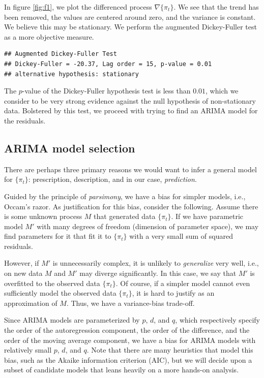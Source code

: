 \documentclass[final,
  11pt,
]{article}
\begin{document}
In figure \ref{fig:f1}, we plot the differenced process \(\nabla\{\pi_t\}\).
We see that the trend has been removed, the values are centered around
zero, and the variance is constant. We believe this may be stationary.
We perform the augmented Dickey-Fuller
test\cite{noauthor_dickeyfuller_2021} as a more objective measure.

\begin{verbatim}
## Augmented Dickey-Fuller Test
## Dickey-Fuller = -20.37, Lag order = 15, p-value = 0.01
## alternative hypothesis: stationary
\end{verbatim}

The \(p\)-value of the Dickey-Fuller hypothesis test is less than
\(0.01\), which we consider to be very strong evidence against the null
hypothesis of non-stationary data. Bolstered by this test, we proceed
with trying to find an ARIMA model for the residuals.

\hypertarget{arima-model-selection}{%
\subsection{ARIMA model selection}\label{arima-model-selection}}

There are perhaps three primary reasons we would want to infer a general
model for \(\{\pi_t\}\): prescription, description, and in our case,
\emph{prediction}.

Guided by the principle of \emph{parsimony}, we have a bias for simpler
models, i.e., Occam's razor. As justification for this bias, consider
the following. Assume there is some unknown process \(M\) that generated
data \(\{\pi_t\}\). If we have parametric model \(M'\) with many degrees
of freedom (dimension of parameter space), we may find parameters for it
that fit it to \(\{\pi_t\}\) with a very small sum of squared residuals.

However, if \(M'\) is unnecessarily complex, it is unlikely to
\emph{generalize} very well, i.e., on new data \(M\) and \(M'\) may
diverge significantly. In this case, we say that \(M'\) is overfitted to
the observed data \(\{\pi_t\}\). Of course, if a simpler model cannot
even sufficiently model the observed data \(\{\pi_t\}\), it is hard to
justify as an approximation of \(M\). Thus, we have a variance-bias
trade-off\cite{bias_variance}.

Since ARIMA models are parameterized by \(p\), \(d\), and \(q\), which
respectively specify the order of the autoregression component, the
order of the difference, and the order of the moving average component,
we have a bias for ARIMA models with relatively small \(p\), \(d\), and
\(q\). Note that there are many heuristics that model this bias, such as
the Akaike information criterion (AIC), but we will decide upon a subset
of candidate models that leans heavily on a more hands-on analysis.
\end{document}

